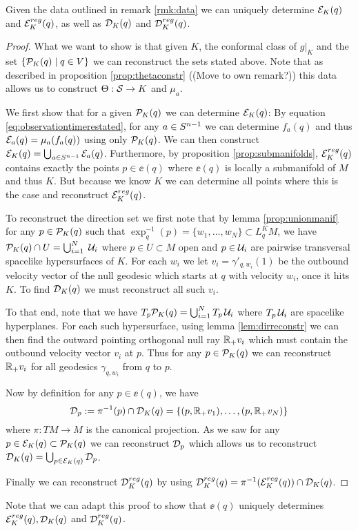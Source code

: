 \begin{proposition}\label{prop:obsreconstr}
    Given the data outlined in remark \ref{rmk:data} we can uniquely determine ${\mathcal{E}}_K(q)$ and ${\mathcal{E}}^{reg}_K(q)$, as well as ${\mathcal{D}}_K(q)$ and ${\mathcal{D}}^{reg}_K(q)$.
\end{proposition}
\begin{proof}
    What we want to show is that given $K$, the conformal class of $g\rvert_{K}$ and the set $\{{{\mathcal{P}}_K(q)} \mid q\in V\}$ we can reconstruct the sets stated above. Note that as described in proposition \ref{prop:thetaconstr} ((Move to own remark?)) this data allows us to construct $\Theta:{\mathcal{S}}\to K$ and $\mu_a$.

    We first show that for a given ${\mathcal{P}}_K(q)$ we can determine ${\mathcal{E}}_K(q)$: By equation \ref{eq:observationtimerestated}, for any $a\in {S^{n-1}}$ we can determine $f_a(q)$ and thus ${\mathcal{E}}_a(q)=\mu_a(f_a(q))$ using only ${{\mathcal{P}}_K(q)}$. We can then construct ${\mathcal{E}}_K(q) = \bigcup_{a\in {S^{n-1}}} {\mathcal{E}}_a(q)$. Furthermore, by proposition \ref{prop:submanifolds}, ${{\mathcal{E}}^{reg}_K}(q)$ contains exactly the points $p\in \ee(q)$ where $\ee(q)$ is locally a submanifold of $M$ and thus $K$. But because we know $K$ we can determine all points where this is the case and reconstruct ${{\mathcal{E}}^{reg}_K}(q)$. 

    To reconstruct the direction set we first note that by lemma \ref{prop:unionmanif} for any $p\in {{\mathcal{P}}_K(q)}$ such that $\exp_q^{-1}(p)=\{w_1,\dots,w_N\}\subset L^K_qM$, we have ${{\mathcal{P}}_K(q)} \cap U = \bigcup_{i=1}^N\; \mathcal{U}_i$ where $p\in U\subset M$ open and $p\in \mathcal{U}_i$ are pairwise transversal spacelike hypersurfaces of $K$. For each $w_i$ we let $v_i=\gamma'_{q,w_i}(1)$ be the outbound velocity vector of the null geodesic which starts at $q$ with velocity $w_i$, once it hits $K$. To find ${\mathcal{D}}_K(q)$ we must reconstruct all such $v_i$.
    
    To that end, note that we have $T_p{{\mathcal{P}}_K(q)} = \bigcup_{i=1}^N T_p\,\mathcal{U}_i$ where $T_p\,\mathcal{U}_i$ are spacelike hyperplanes. For each such hypersurface, using lemma \ref{lem:dirreconstr} we can then find the outward pointing orthogonal null ray $\mathbb{R}_+v_i$ which must contain the outbound velocity vector $v_i$ at $p$. Thus for any $p\in {{\mathcal{P}}_K(q)}$ we can reconstruct $\mathbb{R}_+v_i$ for all geodesics $\gamma_{q,w_i}$ from $q$ to $p$.

   Now by definition for any $p\in \ee(q)$, we have 
    \[
        {\mathcal{D}}_p := \pi^{-1}(p)\cap {\mathcal{D}}_K(q) = \{(p,\mathbb{R}_+v_1), \dots, (p,\mathbb{R}_+v_N)\}
    \]
    where $\pi:TM\to M$ is the canonical projection. As we saw for any $p\in {{\mathcal{E}}_K}(q)\subset {{\mathcal{P}}_K(q)}$ we can reconstruct ${\mathcal{D}}_p$ which allows us to reconstruct ${\mathcal{D}}_K(q) = \bigcup_{p\in {{\mathcal{E}}_K}(q)} {\mathcal{D}}_p$.

    Finally we can reconstruct ${\mathcal{D}}^{reg}_K(q)$ by using ${\mathcal{D}}^{reg}_K(q)=\pi^{-1}({{\mathcal{E}}^{reg}_K}(q)) \cap {\mathcal{D}}_K(q)$.
\end{proof}
Note that we can adapt this proof to show that $\ee(q)$ uniquely determines ${{\mathcal{E}}^{reg}_K}(q), {\mathcal{D}}_K(q)$ and ${\mathcal{D}}^{reg}_K(q)$.

